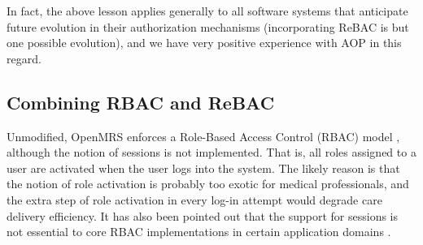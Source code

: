 \documentclass{acm_proc_article-sp}
\newcommand{\ToDo}[1]{\emph{[\textbf{To Do:} #1]}}
\begin{document}
In fact, the above lesson applies generally to all software systems
that anticipate future evolution in their authorization mechanisms
(incorporating ReBAC is but one possible evolution), and we have very
positive experience with AOP in this regard.

\begin{comment}
This lesson is confirmed by our parallel and still not yet successful
efforts to incorporate ReBAC into XWiki, a wiki-style content
management system designed for enterprise environments \cite{XWiki}.
The lack of modularity in its implementation of authorization checks
is the main technical hurdle.


\ToDo{
\begin{itemize}
\item either tune down accusation or explain in more precise terms
  why it is hard to implement ReBAC in XWiki.
\item access request sent to authorization module: (user, page)
\item page can have multi actions executed upon it (e.g., view, edit,
  change
  name, etc)
\item all such auth decisions are made 
\item what is returned is a list is a list of authorizations (i.e.,
  can the page be viewed, edited, name change, etc)
\item at this point we don't know what the user wants to do
\item not able to append the appropriate edge in authorization graph
  (in csc work)
\item so we don't have issue with authorization in XWiki, we have
  issue
  with determining what edges to add or remove
\item So we will face the same problem when we are to implement admin
  actions
  in XWiki
\item  authorization code has its own module
\item multiple caller modules
\end{itemize}
}

\end{comment}

\subsection{Combining RBAC and ReBAC}

Unmodified, OpenMRS enforces a Role-Based Access Control (RBAC) model
\cite{Sandhu-etal:1996}, although the notion of sessions is not
implemented.  That is, all roles assigned to a user are activated when
the user logs into the system.  The likely reason is that the notion
of role activation is probably too exotic for medical professionals,
and the extra step of role activation in every log-in attempt would
degrade care delivery efficiency. It has also been pointed out that
the support for sessions is not essential to core RBAC implementations
in certain application domains \cite{CritiqueANSI}.
\end{document}

